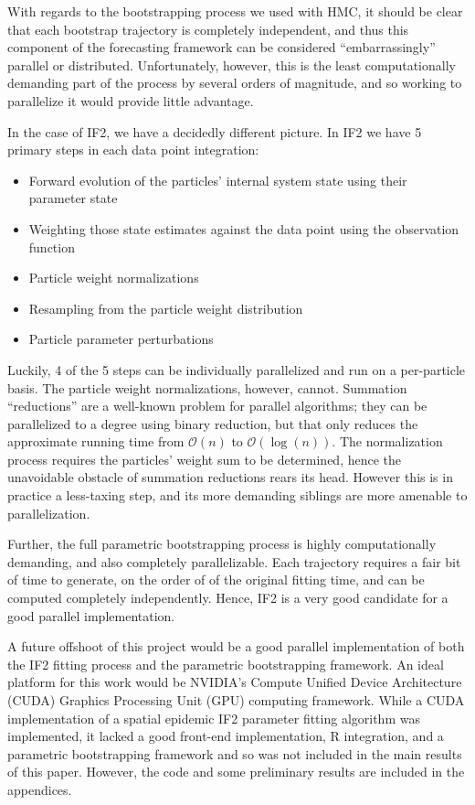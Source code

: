 	With regards to the bootstrapping process we used with HMC, it should be clear that each bootstrap trajectory is completely independent, and thus this component of the forecasting framework can be considered ``embarrassingly'' parallel or distributed. Unfortunately, however, this is the least computationally demanding part of the process by several orders of magnitude, and so working to parallelize it would provide little advantage.

	In the case of IF2, we have a decidedly different picture. In IF2 we have 5 primary steps in each data point integration: 

	\begin{itemize}
		\item Forward evolution of the particles' internal system state using their parameter state
		\item Weighting those state estimates against the data point using the observation function
		\item Particle weight normalizations
		\item Resampling from the particle weight distribution
		\item Particle parameter perturbations
	\end{itemize}

	Luckily, 4 of the 5 steps can be individually parallelized and run on a per-particle basis. The particle weight normalizations, however, cannot. Summation ``reductions'' are a well-known problem for parallel algorithms; they can be parallelized to a degree using binary reduction, but that only reduces the approximate running time from $\mathcal{O}(n)$ to $\mathcal{O}(\log(n))$. The normalization process requires the particles' weight sum to be determined, hence the unavoidable obstacle of summation reductions rears its head. However this is in practice a less-taxing step, and its more demanding siblings are more amenable to parallelization.

	Further, the full parametric bootstrapping process is highly computationally demanding, and also completely parallelizable. Each trajectory requires a fair bit of time to generate, on the order of of the original fitting time, and can be computed completely independently. Hence, IF2 is a very good candidate for a good parallel implementation.

	A future offshoot of this project would be a good parallel implementation of both the IF2 fitting process and the parametric bootstrapping framework. An ideal platform for this work would be NVIDIA's Compute Unified Device Architecture (CUDA) Graphics Processing Unit (GPU) computing framework. While a CUDA implementation of a spatial epidemic IF2 parameter fitting algorithm was implemented, it lacked a good front-end implementation, R integration, and a parametric bootstrapping framework and so was not included in the main results of this paper. However, the code and some preliminary results are included in the appendices.

